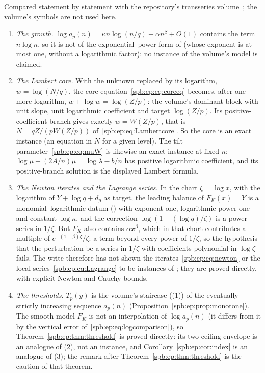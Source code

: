 \begin{remark}\label{spb:ep:rem:transseries}
Compared statement by statement with the repository's transseries
volume~\cite{TSvol}; the volume's symbols are not used here.
\begin{enumerate}\raggedright
\item \emph{The growth.} $\log a_p(n)=\kappa n\log(n/q)+\alpha n^\beta+O(1)$
contains the term $n\log n$, so it is not of the exponential--power form of
 (whose exponent is at most one, without a logarithmic
factor); no instance of the volume's model is claimed.
\item \emph{The Lambert core.} With the unknown replaced by its logarithm,
$w=\log(N/q)$, the core equation~\eqref{spb:ep:eq:coreeq} becomes, after one
more logarithm, $w+\log w=\log(Z/p)$: the volume's dominant block
 with unit slope, unit logarithmic coefficient and
target $\log(Z/p)$. Its positive-coefficient branch gives exactly
$w=W(Z/p)$, that is $N=qZ/(pW(Z/p))$ of~\eqref{spb:ep:eq:Lambertcore}. So the
core is an exact instance (an equation in $N$ for a given level). The tilt
parameter~\eqref{spb:ep:eq:muW} is likewise an exact instance at fixed $n$:
$\log\mu+(2A/n)\mu=\log\lambda-b/n$ has positive logarithmic coefficient, and
its positive-branch solution is the displayed Lambert formula.
\item \emph{The Newton iterates and the Lagrange series.} In the chart
$\zeta=\log x$, with the logarithm of $Y+\log q+d_p$ as target, the leading
balance of $F_K(x)=Y$ is a monomial--logarithmic datum
() with exponent one, logarithmic power
one and constant $\log\kappa$, and the correction $\log(1-(\log q)/\zeta)$ is a
power series in $1/\zeta$. But $F_K$ also contains $\alpha x^\beta$, which in
that chart contributes a multiple of $e^{-(1-\beta)\zeta}/\zeta$: a term beyond
every power of $1/\zeta$, so the hypothesis that the perturbation be a series
in $1/\zeta$ with coefficients polynomial in $\log\zeta$ fails. The write
therefore has not shown the iterates~\eqref{spb:ep:eq:newton} or the local
series~\eqref{spb:ep:eq:Lagrange} to be instances of ;
they are proved directly, with explicit Newton and Cauchy bounds.
\item \emph{The thresholds.} $T_p(y)$ is the volume's staircase
((1)) of the eventually strictly increasing
sequence $a_p(n)$ (Proposition~\ref{spb:ep:prop:monotone}). The smooth model
$F_K$ is not an interpolation of $\log a_p(n)$ (it differs from it by the
vertical error of~\eqref{spb:ep:eq:logcomparison}), so
Theorem~\ref{spb:ep:thm:threshold} is proved directly: its two-ceiling
envelope is an analogue of (2), not an instance, and
Corollary~\ref{spb:ep:cor:index} is an analogue of
(3); the remark after Theorem~\ref{spb:ep:thm:threshold}
is the caution of that theorem.
\end{enumerate}
\end{remark}

